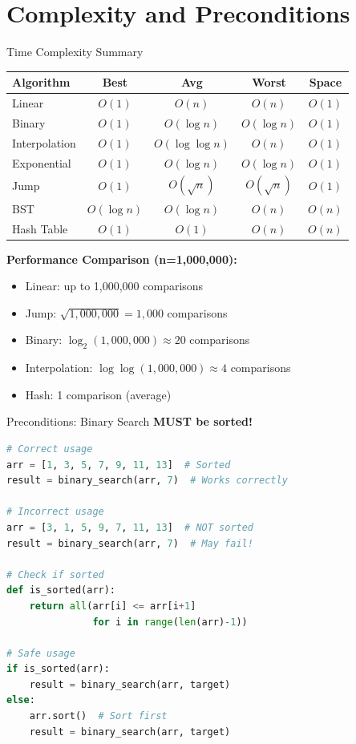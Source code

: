 \documentclass[aspectratio=169]{beamer}
\begin{document}
\section{Complexity and Preconditions}

\begin{frame}{Time Complexity Summary}
  \begin{center}
  \begin{tabular}{|l|c|c|c|c|}
    \hline
    \textbf{Algorithm} & \textbf{Best} & \textbf{Avg} & \textbf{Worst} & \textbf{Space} \\
    \hline
    Linear & $O(1)$ & $O(n)$ & $O(n)$ & $O(1)$ \\
    \hline
    Binary & $O(1)$ & $O(\log n)$ & $O(\log n)$ & $O(1)$ \\
    \hline
    Interpolation & $O(1)$ & $O(\log \log n)$ & $O(n)$ & $O(1)$ \\
    \hline
    Exponential & $O(1)$ & $O(\log n)$ & $O(\log n)$ & $O(1)$ \\
    \hline
    Jump & $O(1)$ & $O(\sqrt{n})$ & $O(\sqrt{n})$ & $O(1)$ \\
    \hline
    BST & $O(\log n)$ & $O(\log n)$ & $O(n)$ & $O(n)$ \\
    \hline
    Hash Table & $O(1)$ & $O(1)$ & $O(n)$ & $O(n)$ \\
    \hline
  \end{tabular}
  \end{center}

  \vspace{0.3cm}
  \textbf{Performance Comparison (n=1,000,000):}
  \begin{itemize}
    \item Linear: up to 1,000,000 comparisons
    \item Jump: $\sqrt{1,000,000} = 1,000$ comparisons
    \item Binary: $\log_2(1,000,000) \approx 20$ comparisons
    \item Interpolation: $\log \log(1,000,000) \approx 4$ comparisons
    \item Hash: 1 comparison (average)
  \end{itemize}
\end{frame}

\begin{frame}[fragile]{Preconditions: Binary Search}
\textbf{MUST be sorted!}

\begin{lstlisting}[language=Python, basicstyle=\ttfamily\small]
# Correct usage
arr = [1, 3, 5, 7, 9, 11, 13]  # Sorted
result = binary_search(arr, 7)  # Works correctly

# Incorrect usage
arr = [3, 1, 5, 9, 7, 11, 13]  # NOT sorted
result = binary_search(arr, 7)  # May fail!

# Check if sorted
def is_sorted(arr):
    return all(arr[i] <= arr[i+1]
               for i in range(len(arr)-1))

# Safe usage
if is_sorted(arr):
    result = binary_search(arr, target)
else:
    arr.sort()  # Sort first
    result = binary_search(arr, target)
\end{lstlisting}
\end{frame}
\end{document}
